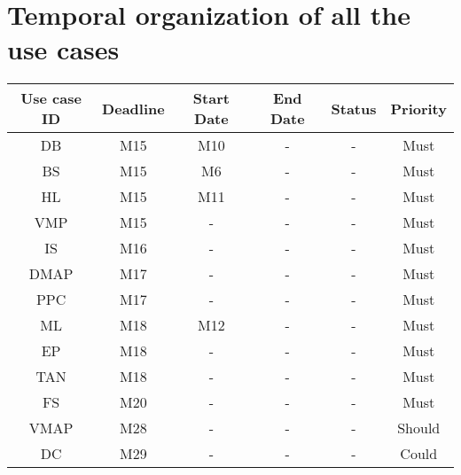\newpage
\section*{Temporal organization of all the use cases}
\label{sec:allusecases}

\begin{table}[H]
\begin{tabular}{cccccc}
\hline
\textbf{Use case ID} & \textbf{Deadline} & \textbf{Start Date} & \textbf{End Date} & \textbf{Status} & \textbf{Priority}\\
\hline
DB & M15 & M10 & - & - & Must \\
BS & M15 & M6 &  - & - & Must \\
HL & M15 & M11 &  - & - & Must \\
VMP & M15 & - &  - & - & Must \\
IS & M16 & - &  - & - & Must \\
DMAP & M17 & - &  - & - & Must \\
PPC & M17 & - &  - & - & Must \\
ML & M18 & M12 &  - & - & Must \\
EP & M18 & - &  - & - & Must \\
TAN & M18 & - &  - & - & Must \\
FS & M20 & - &  - & - & Must \\
VMAP & M28 & - & - & - & Should \\
DC & M29 & - &  - & - & Could \\
\hline
\end{tabular}
\end{table}